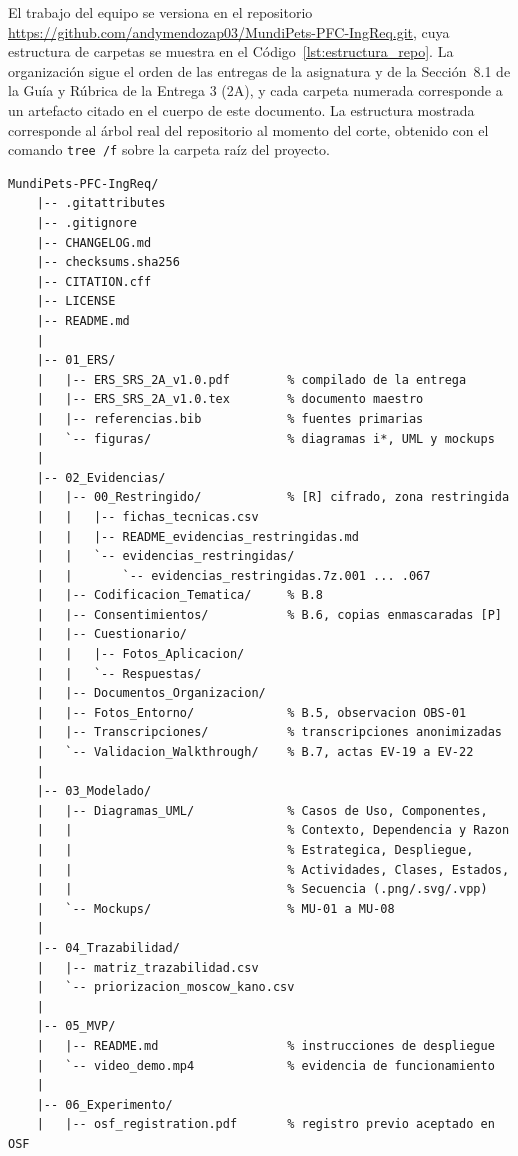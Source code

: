 \documentclass[journal,onecolumn]{IEEEtran}
\begin{document}
El trabajo del equipo se versiona en el repositorio
\url{https://github.com/andymendozap03/MundiPets-PFC-IngReq.git}, cuya
estructura de carpetas se muestra en el Código~\ref{lst:estructura_repo}. La
organización sigue el orden de las entregas de la asignatura y de la
Sección~8.1 de la Guía y Rúbrica de la Entrega 3 (2A), y cada carpeta
numerada corresponde a un artefacto citado en el cuerpo de este documento.
La estructura mostrada corresponde al árbol real del repositorio al
momento del corte, obtenido con el comando \texttt{tree /f} sobre la
carpeta raíz del proyecto.

\begin{lstlisting}[style=csharp,caption={Estructura de carpetas del repositorio MundiPets-PFC-IngReq (árbol real al corte de la Entrega 3, 2A).},label={lst:estructura_repo}]
	MundiPets-PFC-IngReq/
	|-- .gitattributes
	|-- .gitignore
	|-- CHANGELOG.md
	|-- checksums.sha256
	|-- CITATION.cff
	|-- LICENSE
	|-- README.md
	|
	|-- 01_ERS/
	|   |-- ERS_SRS_2A_v1.0.pdf        % compilado de la entrega
	|   |-- ERS_SRS_2A_v1.0.tex        % documento maestro
	|   |-- referencias.bib            % fuentes primarias
	|   `-- figuras/                   % diagramas i*, UML y mockups
	|
	|-- 02_Evidencias/
	|   |-- 00_Restringido/            % [R] cifrado, zona restringida
	|   |   |-- fichas_tecnicas.csv
	|   |   |-- README_evidencias_restringidas.md
	|   |   `-- evidencias_restringidas/
	|   |       `-- evidencias_restringidas.7z.001 ... .067
	|   |-- Codificacion_Tematica/     % B.8
	|   |-- Consentimientos/           % B.6, copias enmascaradas [P]
	|   |-- Cuestionario/
	|   |   |-- Fotos_Aplicacion/
	|   |   `-- Respuestas/
	|   |-- Documentos_Organizacion/
	|   |-- Fotos_Entorno/             % B.5, observacion OBS-01
	|   |-- Transcripciones/           % transcripciones anonimizadas
	|   `-- Validacion_Walkthrough/    % B.7, actas EV-19 a EV-22
	|
	|-- 03_Modelado/
	|   |-- Diagramas_UML/             % Casos de Uso, Componentes,
	|   |                              % Contexto, Dependencia y Razon
	|   |                              % Estrategica, Despliegue,
	|   |                              % Actividades, Clases, Estados,
	|   |                              % Secuencia (.png/.svg/.vpp)
	|   `-- Mockups/                   % MU-01 a MU-08
	|
	|-- 04_Trazabilidad/
	|   |-- matriz_trazabilidad.csv
	|   `-- priorizacion_moscow_kano.csv
	|
	|-- 05_MVP/
	|   |-- README.md                  % instrucciones de despliegue
	|   `-- video_demo.mp4             % evidencia de funcionamiento
	|
	|-- 06_Experimento/
	|   |-- osf_registration.pdf       % registro previo aceptado en OSF

\end{lstlisting}
\end{document}
